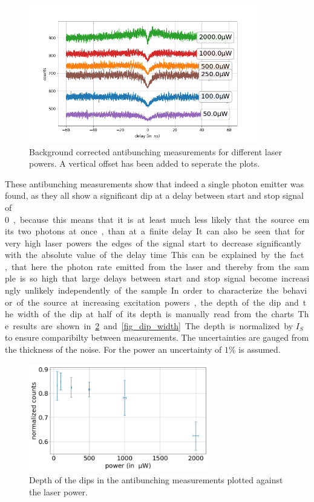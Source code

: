 \begin{figure}[H]
    \centering
    \includegraphics[width=0.9\textwidth]{img/output_t2/massvgl_bgcorr}
    \caption{Background corrected antibunching measurements for different laser powers. A vertical offset has been added to seperate the plots.}
    \label{fig_waterfall}
\end{figure}

These antibunching measurements show that indeed a single photon emitter was found, as they all show a significant dip at a delay between start and stop signal of \SI{0}, because this means that it is at least much less likely that the source emits two photons at once, than at a finite delay.
It can also be seen that for very high laser powers the edges of the signal start to decrease significantly with the absolute value of the delay time.
This can be explained by the fact, that here the photon rate emitted from the laser and thereby from the sample is so high that large delays between start and stop signal become increasingly unlikely independently of the sample.

In order to characterize the behavior of the source at increasing excitation powers, the depth of the dip and the width of the dip at half of its depth is manually read from the charts.
The results are shown in \cref{fig_dip_depth} and \cref{fig_dip_width}.
The depth is normalized by $I_S$ to ensure comparibilty between measurements.
The uncertainties are gauged from the thickness of the noise.
For the power an uncertainty of $1\%$ is assumed.


\begin{figure}[H]
    \centering
    \includegraphics[width=0.7\textwidth]{img/output_t2/dip_depth.png}
    \caption{Depth of the dips in the antibunching measurements plotted against the laser power.}
    \label{fig_dip_depth}
\end{figure}

